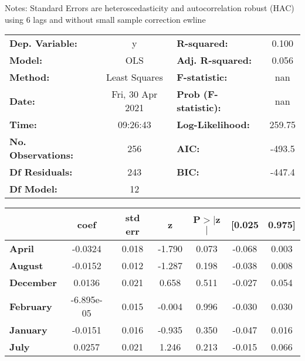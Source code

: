 Notes: \newline
 [1] Standard Errors are heteroscedasticity and autocorrelation robust (HAC) using 6 lags and without small sample correction
ewline\begin{center}
\begin{tabular}{lclc}
\toprule
\textbf{Dep. Variable:}    &        y         & \textbf{  R-squared:         } &     0.100   \\
\textbf{Model:}            &       OLS        & \textbf{  Adj. R-squared:    } &     0.056   \\
\textbf{Method:}           &  Least Squares   & \textbf{  F-statistic:       } &       nan   \\
\textbf{Date:}             & Fri, 30 Apr 2021 & \textbf{  Prob (F-statistic):} &      nan    \\
\textbf{Time:}             &     09:26:43     & \textbf{  Log-Likelihood:    } &    259.75   \\
\textbf{No. Observations:} &         256      & \textbf{  AIC:               } &    -493.5   \\
\textbf{Df Residuals:}     &         243      & \textbf{  BIC:               } &    -447.4   \\
\textbf{Df Model:}         &          12      & \textbf{                     } &             \\
\bottomrule
\end{tabular}
\begin{tabular}{lcccccc}
                   & \textbf{coef} & \textbf{std err} & \textbf{z} & \textbf{P$> |$z$|$} & \textbf{[0.025} & \textbf{0.975]}  \\
\midrule
\textbf{April}     &      -0.0324  &        0.018     &    -1.790  &         0.073        &       -0.068    &        0.003     \\
\textbf{August}    &      -0.0152  &        0.012     &    -1.287  &         0.198        &       -0.038    &        0.008     \\
\textbf{December}  &       0.0136  &        0.021     &     0.658  &         0.511        &       -0.027    &        0.054     \\
\textbf{February}  &   -6.895e-05  &        0.015     &    -0.004  &         0.996        &       -0.030    &        0.030     \\
\textbf{January}   &      -0.0151  &        0.016     &    -0.935  &         0.350        &       -0.047    &        0.016     \\
\textbf{July}      &       0.0257  &        0.021     &     1.246  &         0.213        &       -0.015    &        0.066     \\

\end{tabular}
\end{center}
